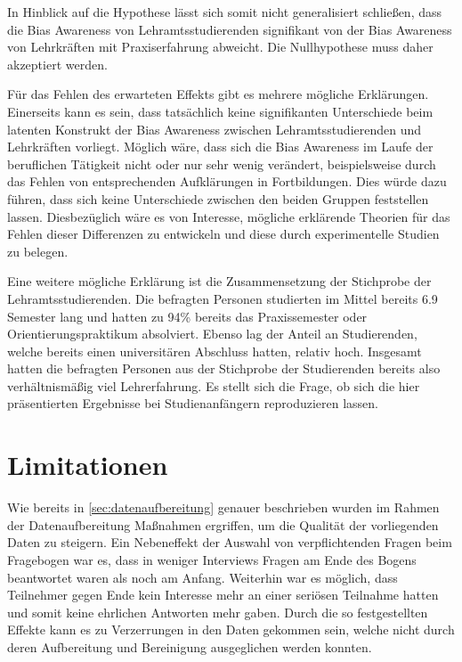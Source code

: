 In Hinblick auf die Hypothese lässt sich somit nicht generalisiert schließen, dass die Bias Awareness von Lehramtsstudierenden signifikant von der Bias Awareness von Lehrkräften mit Praxiserfahrung abweicht.
Die Nullhypothese muss daher akzeptiert werden.

Für das Fehlen des erwarteten Effekts gibt es mehrere mögliche Erklärungen.
Einerseits kann es sein, dass tatsächlich keine signifikanten Unterschiede beim latenten Konstrukt der Bias Awareness zwischen Lehramtsstudierenden und Lehrkräften vorliegt.
Möglich wäre, dass sich die Bias Awareness im Laufe der beruflichen Tätigkeit nicht oder nur sehr wenig verändert, beispielsweise durch das Fehlen von entsprechenden Aufklärungen in Fortbildungen.
Dies würde dazu führen, dass sich keine Unterschiede zwischen den beiden Gruppen feststellen lassen.
Diesbezüglich wäre es von Interesse, mögliche erklärende Theorien für das Fehlen dieser Differenzen zu entwickeln und diese durch experimentelle Studien zu belegen.

Eine weitere mögliche Erklärung ist die Zusammensetzung der Stichprobe der Lehramtsstudierenden.
Die befragten Personen studierten im Mittel bereits 6.9 Semester lang und hatten zu 94\% bereits das Praxissemester oder Orientierungspraktikum absolviert.
Ebenso lag der Anteil an Studierenden, welche bereits einen universitären Abschluss hatten, relativ hoch.
Insgesamt hatten die befragten Personen aus der Stichprobe der Studierenden bereits also verhältnismäßig viel Lehrerfahrung.
Es stellt sich die Frage, ob sich die hier präsentierten Ergebnisse bei Studienanfängern reproduzieren lassen.


\section{Limitationen}
\label{sec:limitationen}

Wie bereits in \autoref{sec:datenaufbereitung} genauer beschrieben wurden im Rahmen der Datenaufbereitung Maßnahmen ergriffen, um die Qualität der vorliegenden Daten zu steigern.
Ein Nebeneffekt der Auswahl von verpflichtenden Fragen beim Fragebogen war es, dass in weniger Interviews Fragen am Ende des Bogens beantwortet waren als noch am Anfang.
Weiterhin war es möglich, dass Teilnehmer gegen Ende kein Interesse mehr an einer seriösen Teilnahme hatten und somit keine ehrlichen Antworten mehr gaben.
Durch die so festgestellten Effekte kann es zu Verzerrungen in den Daten gekommen sein, welche nicht durch deren Aufbereitung und Bereinigung ausgeglichen werden konnten.

